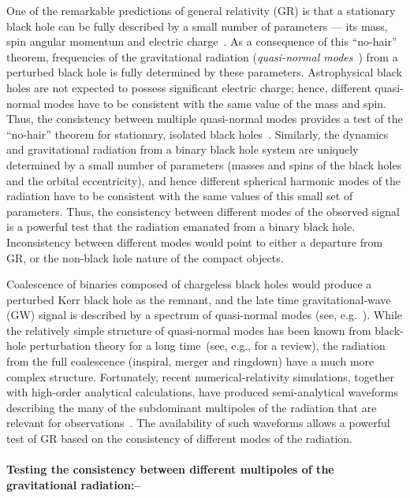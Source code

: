 \documentclass[prl,preprintnumbers,twocolumn,eqsecnum,floatfix,a4paper,nofootinbib,superscriptaddress]{revtex4}
\begin{document}
One of the remarkable predictions of general relativity (GR) is that a stationary black hole can be fully described by a small number of parameters --- its mass, spin angular momentum and electric charge~\cite{Israel:1967,Israel:1968,Carter:1978}. As a consequence of this ``no-hair'' theorem, frequencies of the gravitational radiation (\emph{quasi-normal modes}~\cite{Vishveshwara:1970zz,Press:1971wr,Chandrasekhar:1975zza}) from a perturbed black hole is fully determined by these parameters. Astrophysical black holes are not expected to possess significant electric charge; hence, different quasi-normal modes have to be consistent with the same value of the mass and spin. Thus, the consistency between multiple quasi-normal modes provides a test of the ``no-hair'' theorem for stationary, isolated black holes~\cite{Dreyer:2003bv}. Similarly, the dynamics and gravitational radiation from a binary black hole system are uniquely determined by a small number of parameters (masses and spins of the black holes and the orbital eccentricity), and hence different spherical harmonic modes of the radiation have to be consistent with the same values of this small set of parameters. Thus, the consistency between different modes of the observed signal is a powerful test that the radiation emanated from a binary black hole. Inconsistency between different modes would point to either a departure from GR, or the non-black hole nature of the compact objects. 

Coalescence of binaries composed of chargeless black holes would produce a perturbed Kerr black hole as the remnant, and the late time gravitational-wave (GW) signal is described by a spectrum of quasi-normal modes (see, e.g.~\cite{Buonanno:2006ui}). While the relatively simple structure of quasi-normal modes has been known from black-hole perturbation theory for a long time~(see, e.g., \cite{Berti:2009kk} for a review), the radiation from the full coalescence (inspiral, merger and ringdown) have a much more complex structure. Fortunately, recent numerical-relativity simulations, together with high-order analytical calculations, have produced semi-analytical waveforms describing the many of the subdominant multipoles of the radiation that are relevant for observations~\cite{Pan:2011gk,London:2017bcn,Mehta:2017jpq}. The availability of such waveforms allows a powerful test of GR based on the consistency of different modes of the radiation.  

\paragraph{Testing the consistency between different multipoles of the gravitational radiation:--}
\end{document}
